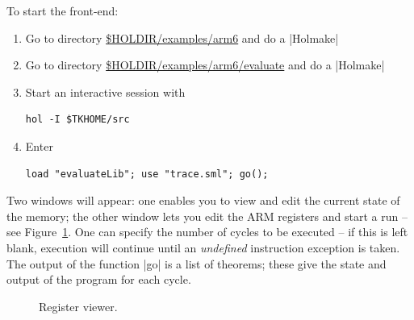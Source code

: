 \documentclass[12pt]{article}
\newcommand{\F}{Figure~}
\begin{document}
To start the front-end:
\begin{enumerate}
\item Go to directory \url{$HOLDIR/examples/arm6} and do a |Holmake|
\item Go to directory \url{$HOLDIR/examples/arm6/evaluate} and do a |Holmake|
\item Start an interactive session with
\begin{Verbatim}
hol -I $TKHOME/src
\end{Verbatim}
\item Enter
\begin{Verbatim}
load "evaluateLib"; use "trace.sml"; go();
\end{Verbatim}
\end{enumerate}
Two windows will appear: one enables you to view and edit the current state of the memory; the other window lets you edit the ARM registers and start a run -- see \F\ref{reg:fig}.   One can specify the number of cycles to be executed -- if this is left blank, execution will continue until an \emph{undefined} instruction exception is taken.  The output of the function |go| is a list of theorems; these give the state and output of the program for each cycle.
\begin{figure}
\begin{center}
\caption{Register viewer.}
\label{reg:fig}
\end{center}
\end{figure}
\end{document}
